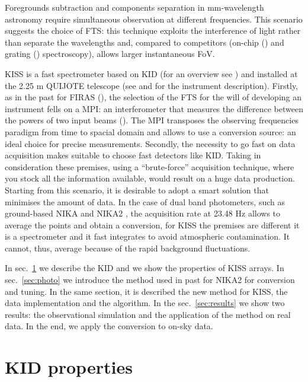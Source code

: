 \documentclass[twocolumn,traditabstract]{aa}\\
\begin{document}
Foregrounds subtraction and components separation in mm-wavelength astronomy require simultaneous observation at different frequencies. This scenario suggests the choice of FTS: this technique exploits the interference of light rather than separate the wavelengths and, compared to competitors (on-chip (\cite{deshima}) and grating (\cite{grating}) spectroscopy), allows larger instantaneous FoV.

KISS is a fast spectrometer based on KID (for an overview see \cite{kids}) and installed at the 2.25 m QUIJOTE telescope (see \cite{fasano-ltd} and \cite{fasano-nika2} for the instrument description). Firstly, as in the past for FIRAS (\cite{FIRAS}), the selection of the FTS for the will of developing an instrument fells on a MPI: an interferometer that measures the difference between the powers of two input beams (\cite{mpi}). The MPI transposes the observing frequencies paradigm from time to spacial domain and allows to use a conversion source: an ideal choice for precise measurements.
Secondly, the necessity to go fast on data acquisition makes suitable to choose fast detectors like KID. Taking in consideration these premises, using a ``brute-force'' acquisition technique, where you stock all the information available, would result on a huge data production. Starting from this scenario, it is desirable to adopt a smart solution that minimises the amount of data.
In the case of dual band photometers, such as ground-based NIKA \cite{Monfardini_2010:NIKA} and NIKA2 \cite{nika2}, the acquisition rate at 23.48 Hz allows to average the points and obtain a conversion, for KISS the premises are different it is a spectrometer and it fast integrates to avoid atmospheric contamination. It cannot, thus, average because of the rapid background fluctuations.

In sec.~\ref{sec:kid} we describe the KID and we show the properties of KISS arrays. 
In sec.~\ref{sec:photo} we introduce the method used in past for NIKA2 for conversion and tuning. In the same section, it is described the new method for KISS, the data implementation and the algorithm.
In the sec.~\ref{sec:results}  we show two results: the observational simulation and the application of the method on real data. In the end, we apply the conversion to on-sky data.

\section{KID properties}
\label{sec:kid}
\end{document}
